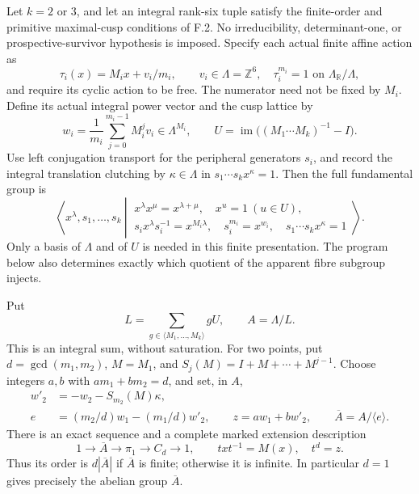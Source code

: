 \begin{theorem}\label{maps:src:F.2.31}


Let $k=2$ or $3$, and let an integral rank-six tuple satisfy the
finite-order and primitive maximal-cusp conditions of F.2.  No
irreducibility, determinant-one, or prospective-survivor hypothesis is
imposed.  Specify each actual finite affine action as
\[
 \tau_i(x)=M_ix+v_i/m_i,\qquad v_i\in\Lambda=\mathbb Z^6,
 \quad \tau_i^{m_i}=1\text{ on }\Lambda_{\mathbb R}/\Lambda,
 \tag{F.G1}\label{maps:eq:F.G1}
\]
and require its cyclic action to be free.  The numerator need not be
fixed by $M_i$.  Define its actual integral power vector and the cusp
lattice by
\[
 w_i=\frac1{m_i}\sum_{j=0}^{m_i-1}M_i^jv_i\in\Lambda^{M_i},
 \qquad U=\operatorname{im}\bigl((M_1\cdots M_k)^{-1}-I\bigr).
 \tag{F.G2}\label{maps:eq:F.G2}
\]
Use left conjugation transport for the peripheral generators $s_i$,
and record the integral translation clutching by $\kappa\in\Lambda$
in $s_1\cdots s_kx^\kappa=1$.  Then the full fundamental group is
\[
 \left\langle x^\lambda,s_1,\ldots,s_k\ \left|\
 \begin{array}{l}
 x^\lambda x^\mu=x^{\lambda+\mu},\quad x^u=1\ (u\in U),\\
 s_ix^\lambda s_i^{-1}=x^{M_i\lambda},\quad
 s_i^{m_i}=x^{w_i},\quad s_1\cdots s_kx^\kappa=1
 \end{array}\right.\right\rangle .                         \tag{F.G3}\label{maps:eq:F.G3}
\]
Only a basis of $\Lambda$ and of $U$ is needed in this finite
presentation.  The program below also determines exactly which
quotient of the apparent fibre subgroup injects.

Put
\[
 L=\sum_{g\in\langle M_1,\ldots,M_k\rangle}gU,
 \qquad A=\Lambda/L.                                      \tag{F.G4}\label{maps:eq:F.G4}
\]
This is an integral sum, without saturation.  For two points, put
$d=\gcd(m_1,m_2)$, $M=M_1$, and
$S_j(M)=I+M+\cdots+M^{j-1}$.  Choose integers $a,b$ with
$am_1+bm_2=d$, and set, in $A$,
\[
 \begin{split}
 w'_2&=-w_2-S_{m_2}(M)\kappa,\\
 e&=(m_2/d)w_1-(m_1/d)w'_2,\qquad
 z=aw_1+bw'_2,\qquad \overline A=A/\langle e\rangle .
 \end{split}                                             \tag{F.G5}\label{maps:eq:F.G5}
\]
There is an exact sequence and a complete marked extension description
\[
 1\longrightarrow\overline A\longrightarrow\pi_1
   \longrightarrow C_d\longrightarrow1,
 \qquad txt^{-1}=M(x),\quad t^d=z.                         \tag{F.G6}\label{maps:eq:F.G6}
\]
Thus its order is $d|\overline A|$ if $\overline A$ is finite;
otherwise it is infinite.  In particular $d=1$ gives precisely
the abelian group $\overline A$.


\end{theorem}
